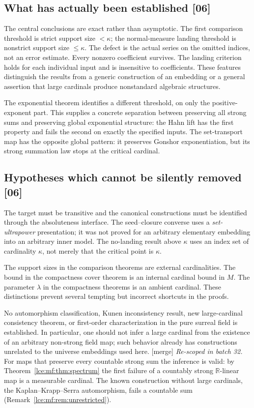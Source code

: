 \documentclass[11pt,letterpaper]{article}
\numberwithin{equation}{section}
\theoremstyle{definition}
\theoremstyle{remark}
\newcommand{\R}{\mathbb R}
\newcommand{\thref}[1]{Theorem~\ref{#1}}
\newcommand{\src}[1]{\textup{\textsf{\small[#1]}}}%
\newcommand{\mergetag}{\textup{\textsf{\small[merge]}}}%
\begin{document}
\subsection{What has actually been established \src{06}}
The central conclusions are exact rather than asymptotic. The first
comparison threshold is strict support size $<\kappa$; the normal-measure
landing threshold is nonstrict support size $\le\kappa$. The defect is the
actual series on the omitted indices, not an error estimate. Every nonzero
coefficient survives. The landing criterion holds for each individual input
and is insensitive to coefficients. These features distinguish the results
from a generic construction of an embedding or a general assertion that
large cardinals produce nonstandard algebraic structures.

The exponential theorem identifies a different threshold, on only the
positive-exponent part. This supplies a concrete separation between
preserving all strong sums and preserving global exponential structure: the
Hahn lift has the first property and fails the second on exactly the
specified inputs. The set-transport map has the opposite global pattern: it
preserves Gonshor exponentiation, but its strong summation law stops at the
critical cardinal.

\subsection{Hypotheses which cannot be silently removed \src{06}}
The target must be transitive and the canonical constructions must be
identified through the absoluteness interface. The seed--closure converse
uses a \emph{set-ultrapower} presentation; it was not proved for an
arbitrary elementary embedding into an arbitrary inner model. The
no-landing result above $\kappa$ uses an index set of cardinality $\kappa$,
not merely that the critical point is $\kappa$.

The support sizes in the comparison theorems are external cardinalities.
The bound in the compactness cover theorem is an internal cardinal bound in
$M$. The parameter $\lambda$ in the compactness theorems is an ambient
cardinal. These distinctions prevent several tempting but incorrect
shortcuts in the proofs.

No automorphism classification, Kunen inconsistency result, new
large-cardinal consistency theorem, or first-order characterization in the
pure surreal field is established. In particular, one should not infer a
large cardinal from the existence of an arbitrary non-strong field map; such
behavior already has constructions unrelated to the universe embeddings
used here.
\mergetag{} \emph{Re-scoped in batch 32.} For maps that preserve every
countable strong sum the inference is valid: by \thref{lce:mf:thm:spectrum}
the first failure of a countably strong $\R$-linear map is a measurable
cardinal. The known construction without large cardinals, the
Kaplan--Krapp--Serra automorphism, fails a countable sum
(Remark~\ref{lce:mf:rem:unrestricted}).
\end{document}
